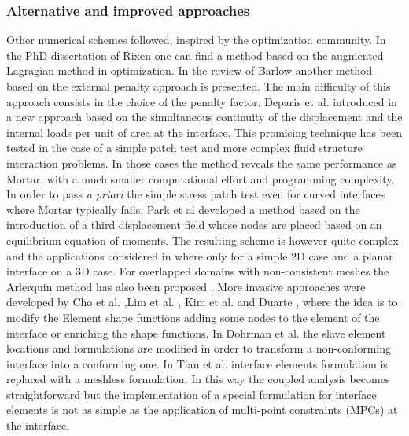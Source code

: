 \subsubsection{Alternative and improved approaches}
 Other numerical schemes followed, inspired by the optimization community. In the PhD dissertation of Rixen \cite{rixen1997substructuring} one can find a method based on the augmented Lagragian method in optimization. In the review of  Barlow \cite{barlow1982constraint} another method based on the external penalty approach is presented. 
 The main difficulty of this approach consists in the choice of the penalty factor. 
 Deparis et al. introduced in \cite{deparis2016internodes} a new approach based on the simultaneous continuity of the displacement and the internal loads per unit of area at the interface. This promising technique has been tested in the case of a simple patch test and more complex fluid structure interaction problems. In those cases the method reveals the same performance as Mortar, with a much smaller computational effort and programming complexity. 
 In order to pass \textit{\textit{\textit{a priori}}} the simple stress patch test even for curved interfaces where Mortar typically fails,  Park et al \cite{park2002simpl} developed a method  based on the introduction of a third displacement field whose nodes are placed based on an equilibrium equation of moments. The resulting scheme is however quite complex and the applications considered in \cite{park2002simpl} where only for a simple 2D case and a planar interface on a 3D case. 
 For overlapped domains with non-consistent meshes the Arlerquin method has also been proposed \cite{dhia2005arlequin,dhia2008multimodeling}.
 More invasive approaches were developed by Cho et al. \cite{cho2005improved,cho2006mls,cho2006mlsII},Lim et al. \cite{lim2007mls,lim2007variable} , Kim et al. \cite{kim2003interface} and Duarte \cite{duarte2008analysis}, where the idea is to modify the Element shape functions adding some nodes to the element of the interface or enriching the shape functions. In Dohrman et al. \cite{dohrmann2000method,dohrmann2000methods} the slave element locations and formulations are modified in order to transform a non-conforming interface into a conforming one.
 In Tian et al. \cite{tian2007non} interface elements formulation is replaced with a meshless formulation. 
 In this way the coupled analysis becomes straightforward  but the implementation of a special formulation for interface elements is not as simple as the application of multi-point constraints (MPCs) at the interface. 
